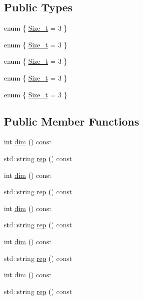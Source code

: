 \subsection*{Public Types}
\begin{DoxyCompactItemize}
\item 
enum \{ \mbox{\hyperlink{structHadron_1_1J1Rep_ae1134ec114a975cb1f22d74834b85f4aa4f0d9bc3adf30bfbce6f630003d386c8}{Size\+\_\+t}} = 3
 \}
\item 
enum \{ \mbox{\hyperlink{structHadron_1_1J1Rep_ae1134ec114a975cb1f22d74834b85f4aa4f0d9bc3adf30bfbce6f630003d386c8}{Size\+\_\+t}} = 3
 \}
\item 
enum \{ \mbox{\hyperlink{structHadron_1_1J1Rep_ae1134ec114a975cb1f22d74834b85f4aa4f0d9bc3adf30bfbce6f630003d386c8}{Size\+\_\+t}} = 3
 \}
\item 
enum \{ \mbox{\hyperlink{structHadron_1_1J1Rep_ae1134ec114a975cb1f22d74834b85f4aa4f0d9bc3adf30bfbce6f630003d386c8}{Size\+\_\+t}} = 3
 \}
\item 
enum \{ \mbox{\hyperlink{structHadron_1_1J1Rep_ae1134ec114a975cb1f22d74834b85f4aa4f0d9bc3adf30bfbce6f630003d386c8}{Size\+\_\+t}} = 3
 \}
\end{DoxyCompactItemize}
\subsection*{Public Member Functions}
\begin{DoxyCompactItemize}
\item 
int \mbox{\hyperlink{structHadron_1_1J1Rep_a59c9039238a259026aa68b2c30b3822a}{dim}} () const
\item 
std\+::string \mbox{\hyperlink{structHadron_1_1J1Rep_af725f8ff10c84cda5410728ce30697da}{rep}} () const
\item 
int \mbox{\hyperlink{structHadron_1_1J1Rep_a59c9039238a259026aa68b2c30b3822a}{dim}} () const
\item 
std\+::string \mbox{\hyperlink{structHadron_1_1J1Rep_af725f8ff10c84cda5410728ce30697da}{rep}} () const
\item 
int \mbox{\hyperlink{structHadron_1_1J1Rep_a59c9039238a259026aa68b2c30b3822a}{dim}} () const
\item 
std\+::string \mbox{\hyperlink{structHadron_1_1J1Rep_af725f8ff10c84cda5410728ce30697da}{rep}} () const
\item 
int \mbox{\hyperlink{structHadron_1_1J1Rep_a59c9039238a259026aa68b2c30b3822a}{dim}} () const
\item 
std\+::string \mbox{\hyperlink{structHadron_1_1J1Rep_af725f8ff10c84cda5410728ce30697da}{rep}} () const
\item 
int \mbox{\hyperlink{structHadron_1_1J1Rep_a59c9039238a259026aa68b2c30b3822a}{dim}} () const
\item 
std\+::string \mbox{\hyperlink{structHadron_1_1J1Rep_af725f8ff10c84cda5410728ce30697da}{rep}} () const
\end{DoxyCompactItemize}


